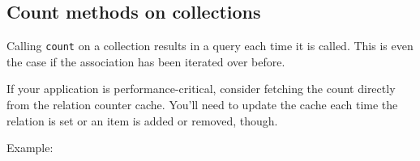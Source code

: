 

\subsection{Count methods on collections}
\label{relation-count}

Calling \texttt{count} on a collection results in a query each time it is called. This is even the case if the association has been iterated over before.

If your application is performance-critical, consider fetching the count directly from the relation counter cache. You'll need to update the cache each time the relation is set or an item is added or removed, though.

Example:

